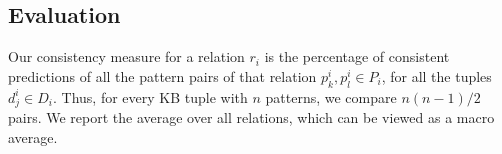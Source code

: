 
\subsection{Evaluation}
\label{sec:eval}


Our consistency measure for a relation $r_i$ is the
percentage of consistent predictions of all the pattern pairs
of that relation $p_k^i,p_l^i \in P_i$, for all the tuples
$d_j^i \in D_i$. Thus, for every KB tuple with $n$ patterns, we compare $n(n-1)/2$ pairs.
We
report the
average over all relations, which can be viewed as a macro
average.


